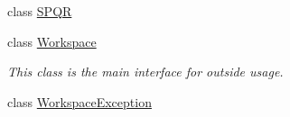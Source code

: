 \begin{DoxyCompactItemize}
class \hyperlink{class_isotope_fit_1_1_s_p_q_r}{S\+P\+QR}
\item 
class \hyperlink{class_isotope_fit_1_1_workspace}{Workspace}
\begin{DoxyCompactList}\small\item\em This class is the main interface for outside usage. \end{DoxyCompactList}\item 
class \hyperlink{class_isotope_fit_1_1_workspace_exception}{Workspace\+Exception}
\end{DoxyCompactItemize}
